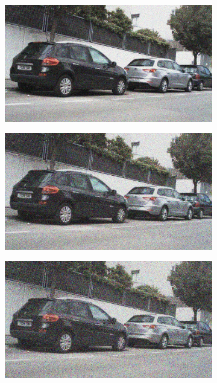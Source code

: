 \documentclass[a4paper]{ctexart}
\begin{document}
\begin{figure}[htbp]
\begin{subfigure}{0.08\textwidth}
			\label{fig：Gamma=0.7, Gauss Noise = 0.1}
		\end{subfigure}
		\begin{subfigure}{0.08\textwidth}
			\captionsetup{font=scriptsize}
			\includegraphics[width=\linewidth]{picture/Edge Detection/degrade/RGB_001 Gamma=0.7, Gauss Noise=0.2}
			\label{fig：Gamma=0.7, Gauss Noise = 0.2}
		\end{subfigure}
		\begin{subfigure}{0.08\textwidth}
			\captionsetup{font=scriptsize}
			\includegraphics[width=\linewidth]{picture/Edge Detection/degrade/RGB_001 Gamma=0.7, Gauss Noise=0.3}
			\label{fig：Gamma=0.7, Gauss Noise = 0.3}
		\end{subfigure}
		\begin{subfigure}{0.08\textwidth}
			\captionsetup{font=scriptsize}
			\includegraphics[width=\linewidth]{picture/Edge Detection/degrade/RGB_001 Gamma=0.7, Gauss Noise=0.4}

\end{subfigure}
\end{figure}
\end{document}
